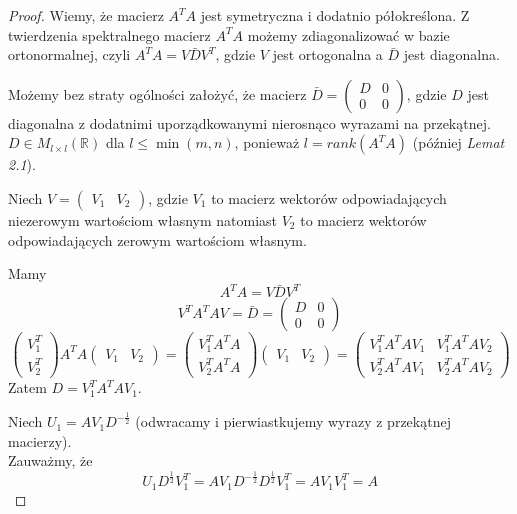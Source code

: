 \documentclass{article}
\theoremstyle{definition}
\begin{document}
\begin{proof}
Wiemy, że macierz $A^TA$ jest symetryczna i dodatnio półokreślona. Z twierdzenia spektralnego macierz $A^TA$ możemy zdiagonalizować w bazie ortonormalnej, czyli $A^TA = V \bar{D} V^T$, gdzie $V$ jest ortogonalna a $\bar{D}$ jest diagonalna. 

Możemy bez straty ogólności założyć, że macierz $\bar{D} = \begin{pmatrix} D & 0 \\ 0 & 0 \end{pmatrix}$, gdzie $D$ jest diagonalna z dodatnimi uporządkowanymi nierosnąco wyrazami na przekątnej. $D \in M_{l \times l} (\mathbb{R})$ dla $l \leq \min (m,n)$, ponieważ $l = rank(A^TA)$ (później \textit{Lemat 2.1}).

Niech $V = \begin{pmatrix} V_1 & V_2 \end{pmatrix}$, gdzie $V_1$ to macierz wektorów odpowiadających niezerowym wartościom własnym natomiast $V_2$ to macierz wektorów odpowiadających zerowym wartościom własnym.

Mamy $$ A^TA = V \bar{D} V^T $$
$$ V^T A^TA V = \bar{D} = \begin{pmatrix} D & 0 \\ 0 & 0 \end{pmatrix} $$
$$ \begin{pmatrix} V_1^T \\ V_2^T \end{pmatrix} A^TA \begin{pmatrix} V_1 & V_2 \end{pmatrix} = \begin{pmatrix} V_1^T A^T A \\ V_2^T A^TA \end{pmatrix} \begin{pmatrix} V_1 & V_2 \end{pmatrix} = \begin{pmatrix} V_1^T A^TA V_1 & V_1^T A^TA V_2 \\ V_2^T A^TA V_1 & V_2^T A^TA V_2 \end{pmatrix}$$
Zatem $D =  V_1^T A^TA V_1$.

Niech $U_1 = AV_1D^{-\frac{1}{2}}$ (odwracamy i pierwiastkujemy wyrazy z przekątnej macierzy).\\Zauważmy, że
$$ U_1 D^{\frac{1}{2}} V_1^T = AV_1 D^{-\frac{1}{2}} D^{\frac{1}{2}} V_1^T = A V_1 V_1^T = A $$


\end{proof}
\end{document}
